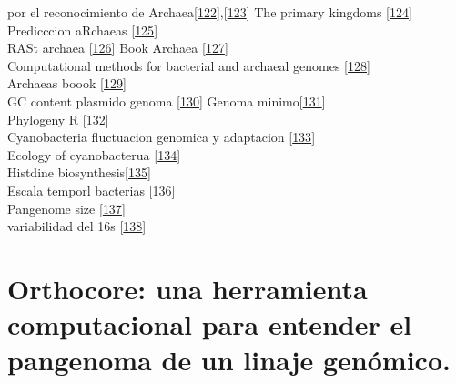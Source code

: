 \documentclass[12pt,twoside]{reedthesis}
\begin{document}
  por el reconocimiento de
  Archaea{[}\protect\hyperlink{ref-woese_are_1981}{122}{]},{[}\protect\hyperlink{ref-woese_towards_1990}{123}{]}
  The primary kingdoms
  {[}\protect\hyperlink{ref-woese_phylogenetic_1977}{124}{]}\\
  Predicccion aRchaeas
  {[}\protect\hyperlink{ref-woese_there_1994}{125}{]}\\
  RASt archaea {[}\protect\hyperlink{ref-graham_archaeal_2000}{126}{]}
  Book Archaea
  {[}\protect\hyperlink{ref-howland_surprising_2000}{127}{]}\\
  Computational methods for bacterial and archaeal genomes
  {[}\protect\hyperlink{ref-xu_computational_2008}{128}{]}\\
  Archaeas boook {[}\protect\hyperlink{ref-garrett_archaea_2008}{129}{]}\\
  GC content plasmido genoma
  {[}\protect\hyperlink{ref-nishida_evolution_2012}{130}{]} Genoma
  minimo{[}\protect\hyperlink{ref-coyle_mysteries_2016}{131}{]}\\
  Phylogeny R {[}\protect\hyperlink{ref-omeara_cran_2016}{132}{]}\\
  Cyanobacteria fluctuacion genomica y adaptacion
  {[}\protect\hyperlink{ref-larsson_genome_2011}{133}{]}\\
  Ecology of cyanobacterua
  {[}\protect\hyperlink{ref-whitton_ecology_2012}{134}{]}\\
  Histdine
  biosynthesis{[}\protect\hyperlink{ref-cohen_biosynthesis_2004}{135}{]}\\
  Escala temporl bacterias
  {[}\protect\hyperlink{ref-battistuzzi_genomic_2004}{136}{]}\\
  Pangenome size
  {[}\protect\hyperlink{ref-lapierre_estimating_2009}{137}{]}\\
  variabilidad del 16s
  {[}\protect\hyperlink{ref-vetrovsky_variability_2013}{138}{]}
  
  \chapter{Orthocore: una herramienta computacional para entender el
  pangenoma de un linaje
  genómico.}\label{orthocore-una-herramienta-computacional-para-entender-el-pangenoma-de-un-linaje-genomico.}
  
\end{document}
